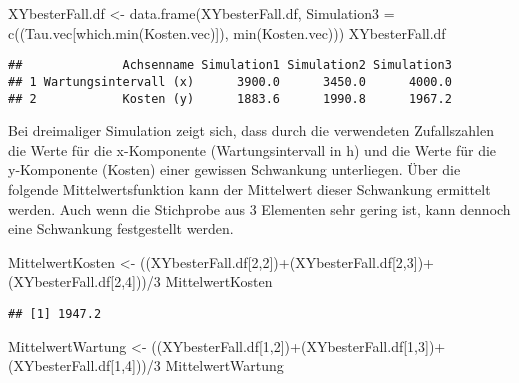 \documentclass[
]{article}
\newenvironment{Shaded}{\begin{snugshade}}{\end{snugshade}}
\newcommand{\AttributeTok}[1]{\textcolor[rgb]{0.77,0.63,0.00}{#1}}
\newcommand{\DecValTok}[1]{\textcolor[rgb]{0.00,0.00,0.81}{#1}}
\newcommand{\FunctionTok}[1]{\textcolor[rgb]{0.00,0.00,0.00}{#1}}
\newcommand{\NormalTok}[1]{#1}
\newcommand{\OtherTok}[1]{\textcolor[rgb]{0.56,0.35,0.01}{#1}}
\newcommand{\SpecialCharTok}[1]{\textcolor[rgb]{0.00,0.00,0.00}{#1}}
\begin{document}
\begin{Shaded}
\begin{Highlighting}[]
\NormalTok{XYbesterFall.df }\OtherTok{\textless{}{-}} \FunctionTok{data.frame}\NormalTok{(XYbesterFall.df, }\AttributeTok{Simulation3 =} \FunctionTok{c}\NormalTok{((Tau.vec[}\FunctionTok{which.min}\NormalTok{(Kosten.vec)]), }\FunctionTok{min}\NormalTok{(Kosten.vec)))}
\NormalTok{XYbesterFall.df}
\end{Highlighting}
\end{Shaded}

\begin{verbatim}
##              Achsenname Simulation1 Simulation2 Simulation3
## 1 Wartungsintervall (x)      3900.0      3450.0      4000.0
## 2            Kosten (y)      1883.6      1990.8      1967.2
\end{verbatim}

Bei dreimaliger Simulation zeigt sich, dass durch die verwendeten
Zufallszahlen die Werte für die x-Komponente (Wartungsintervall in h)
und die Werte für die y-Komponente (Kosten) einer gewissen Schwankung
unterliegen. Über die folgende Mittelwertsfunktion kann der Mittelwert
dieser Schwankung ermittelt werden. Auch wenn die Stichprobe aus 3
Elementen sehr gering ist, kann dennoch eine Schwankung festgestellt
werden.

\begin{Shaded}
\begin{Highlighting}[]
\NormalTok{MittelwertKosten }\OtherTok{\textless{}{-}}\NormalTok{ ((XYbesterFall.df[}\DecValTok{2}\NormalTok{,}\DecValTok{2}\NormalTok{])}\SpecialCharTok{+}\NormalTok{(XYbesterFall.df[}\DecValTok{2}\NormalTok{,}\DecValTok{3}\NormalTok{])}\SpecialCharTok{+}\NormalTok{(XYbesterFall.df[}\DecValTok{2}\NormalTok{,}\DecValTok{4}\NormalTok{]))}\SpecialCharTok{/}\DecValTok{3}
\NormalTok{MittelwertKosten}
\end{Highlighting}
\end{Shaded}

\begin{verbatim}
## [1] 1947.2
\end{verbatim}

\begin{Shaded}
\begin{Highlighting}[]
\NormalTok{MittelwertWartung }\OtherTok{\textless{}{-}}\NormalTok{ ((XYbesterFall.df[}\DecValTok{1}\NormalTok{,}\DecValTok{2}\NormalTok{])}\SpecialCharTok{+}\NormalTok{(XYbesterFall.df[}\DecValTok{1}\NormalTok{,}\DecValTok{3}\NormalTok{])}\SpecialCharTok{+}\NormalTok{(XYbesterFall.df[}\DecValTok{1}\NormalTok{,}\DecValTok{4}\NormalTok{]))}\SpecialCharTok{/}\DecValTok{3}
\NormalTok{MittelwertWartung}
\end{Highlighting}
\end{Shaded}
\end{document}
